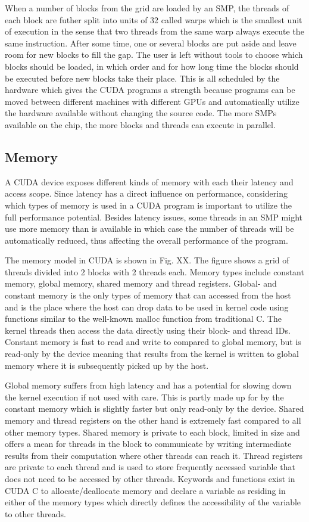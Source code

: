 When a number of blocks from the grid are loaded by an SMP, the threads of each block are futher split into units of 32 called warps which is the smallest unit of execution in the sense that two threads from the same warp always execute the same instruction. After some time, one or several blocks are put aside and leave room for new blocks to fill the gap. The user is left without tools to choose which blocks should be loaded, in which order and for how long time the blocks should be executed before new blocks take their place. This is all scheduled by the hardware which gives the CUDA programs a strength because programs can be moved between different machines with different GPUs and automatically utilize the hardware available without changing the source code. The more SMPs available on the chip, the more blocks and threads can execute in parallel.

\subsection{Memory}
A CUDA device exposes different kinds of memory with each their latency and access scope. Since latency has a direct influence on performance, considering which types of memory is used in a CUDA program is important to utilize the full performance potential. Besides latency issues, some threads in an SMP might use more memory than is available in which case the number of threads will be automatically reduced, thus affecting the overall performance of the program. 

The memory model in CUDA is shown in Fig. XX. The figure shows a grid of threads divided into 2 blocks with 2 threads each. Memory types include constant memory, global memory, shared memory and thread registers. Global- and constant memory is the only types of memory that can accessed from the host and is the place where the host can drop data to be used in kernel code using functions similar to the well-known malloc function from traditional C. The kernel threads then access the data directly using their block- and thread IDs. Constant memory is fast to read and write to compared to global memory, but is read-only by the device meaning that results from the kernel is written to global memory where it is subsequently picked up by the host.

Global memory suffers from high latency and has a potential for slowing down the kernel execution if not used with care. This is partly made up for by the constant memory which is slightly faster but only read-only by the device. Shared memory and thread registers on the other hand is extremely fast compared to all other memory types. Shared memory is private to each block, limited in size and offers a mean for threads in the block to communicate by writing intermediate results from their computation where other threads can reach it. Thread registers are private to each thread and is used to store frequently accessed variable that does not need to be accessed by other threads. Keywords and functions exist in CUDA C to allocate/deallocate memory and declare a variable as residing in either of the memory types which directly defines the accessibility of the variable to other threads.